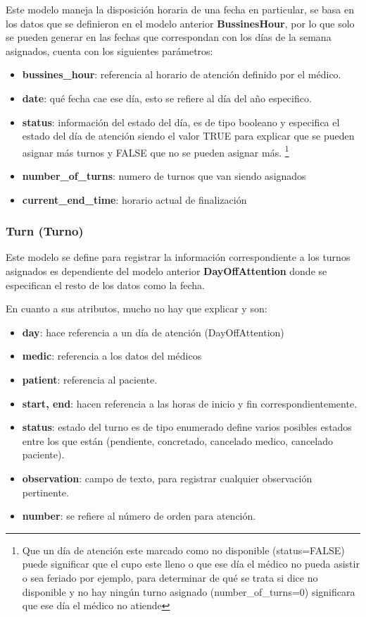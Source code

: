 Este modelo maneja la disposición horaria de una fecha en particular, se basa en los datos que se definieron en el modelo anterior \textbf{BussinesHour}, por lo que solo se pueden generar en las fechas que correspondan con los días de la semana asignados, cuenta con los siguientes parámetros:

\begin{itemize}
    \item \textbf{bussines\_hour}: referencia al horario de atención definido  por el médico.
    \item \textbf{date}: qué fecha cae ese día, esto se refiere al día del año  especifico.
    \item \textbf{status}: información del estado del día, es de tipo booleano  y especifica el estado del día de atención siendo el valor TRUE para explicar que se pueden asignar más turnos y FALSE que no se  pueden asignar más. \footnote{ Que un día de atención este marcado como no disponible (status=FALSE) puede significar que el cupo este lleno o que ese día el médico no pueda asistir o sea feriado por ejemplo, para         determinar de qué se trata si dice no disponible y no hay ningún turno asignado (number\_of\_turns=0) significara que ese día el médico no atiende }
     \item \textbf{number\_of\_turns}: numero de turnos que van siendo asignados
     \item \textbf{current\_end\_time}: horario actual de finalización 
\end{itemize}


\subsubsection{Turn (Turno)}

Este modelo se define para registrar la información correspondiente a los turnos asignados es dependiente del modelo anterior \textbf{DayOffAttention} donde se especifican el resto de los datos como la fecha.

En cuanto a sus atributos, mucho no hay que explicar y son:

\begin{itemize}
    \item \textbf{day}: hace referencia a un día de atención (DayOffAttention)
    \item \textbf{medic}: referencia a los datos del médicos
    \item \textbf{patient}: referencia al paciente. 
    \item \textbf{start, end}: hacen referencia a las horas de inicio y fin correspondientemente.
    \item \textbf{status}: estado del turno es de tipo enumerado define varios posibles estados entre los que están (pendiente, concretado, cancelado medico, cancelado paciente).
    \item \textbf{observation}: campo de texto, para registrar cualquier  observación pertinente.
    \item \textbf{number}: se refiere al número de orden para atención.
\end{itemize}


